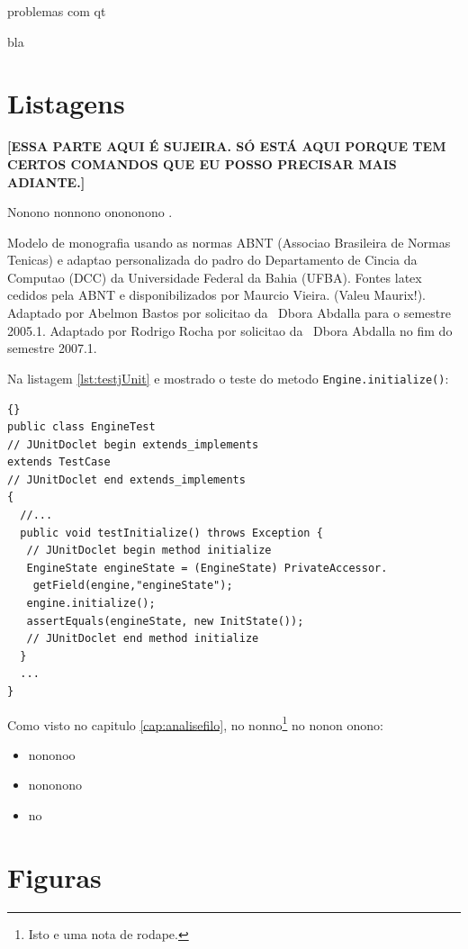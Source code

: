 problemas com qt

bla



\section{Listagens} \label{sec:listagens}

\textbf{[ESSA PARTE AQUI É SUJEIRA. SÓ ESTÁ AQUI PORQUE TEM CERTOS COMANDOS QUE EU POSSO PRECISAR MAIS ADIANTE.]}

Nonono nonnono onononono \cite{fowler2000}.

Modelo de monografia usando as normas ABNT (Associao Brasileira de Normas
Tenicas) 
e adaptao personalizada 
do padro do Departamento de Cincia da Computao (DCC) da Universidade
Federal da Bahia (UFBA).
Fontes latex cedidos pela ABNT e disponibilizados por 
Maurcio Vieira. (Valeu Maurix!). Adaptado por Abelmon Bastos por solicitao
da \profa\ Dbora Abdalla para o semestre 2005.1.
Adaptado por Rodrigo Rocha por solicitao da \profa\ Dbora Abdalla no fim
do semestre 2007.1.

Na listagem \ref{lst:testjUnit} 
e mostrado o teste do metodo \texttt{Engine.initialize()}:

\lstset{language=java}
\lstset{commentstyle=\textit}
\begin{lstlisting}[frame=trbl, caption=Classe Factory2D,label=lst:testjUnit]{}
public class EngineTest
// JUnitDoclet begin extends_implements
extends TestCase
// JUnitDoclet end extends_implements
{
  //...
  public void testInitialize() throws Exception {
   // JUnitDoclet begin method initialize
   EngineState engineState = (EngineState) PrivateAccessor.
    getField(engine,"engineState");
   engine.initialize();
   assertEquals(engineState, new InitState());
   // JUnitDoclet end method initialize
  }
  ...
}
\end{lstlisting}

Como visto no capitulo \ref{cap:analisefilo}, no nonno\footnote{Isto e uma nota
de rodape.} no nonon onono:
\begin{itemize}
  \item{nononoo}
  \item{nononono}
  \item{no}
\end{itemize}


\section{Figuras} \label{sec:figuras}

